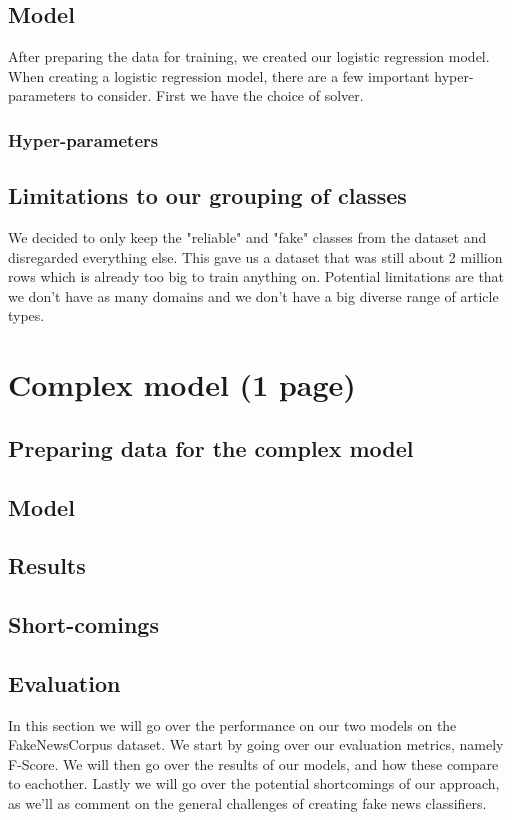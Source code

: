 \documentclass{article}
\begin{document}
\subsection{Model}
After preparing the data for training, we created our logistic regression model. When creating a logistic regression
model, there are a few important hyper-parameters to consider. First we have the choice of solver. 
\subsubsection{Hyper-parameters}


\subsection{Limitations to our grouping of classes}
We decided to only keep the "reliable" and "fake" classes from the dataset and disregarded everything else. This gave us a dataset that was still about 2 million rows which is already too big to train anything on. Potential limitations are that we don't have as many domains and we don't have a big diverse range of article types.


\section{Complex model (1 page)}\label{sec:complex_model}
\subsection{Preparing data for the complex model}

\subsection{Model}

\subsection{Results}

\subsection{Short-comings}

\subsection{Evaluation}
In this section we will go over the performance on our two models on the FakeNewsCorpus dataset. We start by going over
our evaluation metrics, namely F-Score. We will then go over the results of our models, and how these compare to
eachother. Lastly we will go over the potential shortcomings of our approach, as we'll as comment on the general
challenges of creating fake news classifiers.
\end{document}
